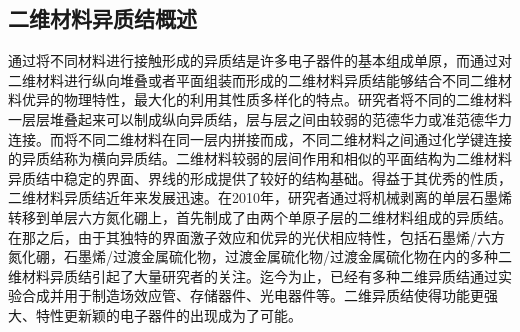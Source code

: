 \subsection{二维材料异质结概述}
    通过将不同材料进行接触形成的异质结是许多电子器件的基本组成单原，而通过对二维材料进行纵向堆叠或者平面组装而形成的二维材料异质结能够结合不同二维材料优异的物理特性，最大化的利用其性质多样化的特点。研究者将不同的二维材料一层层堆叠起来可以制成纵向异质结，层与层之间由较弱的范德华力或准范德华力连接。而将不同二维材料在同一层内拼接而成，不同二维材料之间通过化学键连接的异质结称为横向异质结。二维材料较弱的层间作用和相似的平面结构为二维材料异质结中稳定的界面、界线的形成提供了较好的结构基础。得益于其优秀的性质，二维材料异质结近年来发展迅速。在2010年，研究者通过将机械剥离的单层石墨烯转移到单层六方氮化硼上，首先制成了由两个单原子层的二维材料组成的异质结。在那之后，由于其独特的界面激子效应和优异的光伏相应特性，包括石墨烯/六方氮化硼，石墨烯/过渡金属硫化物，过渡金属硫化物/过渡金属硫化物在内的多种二维材料异质结引起了大量研究者的关注。迄今为止，已经有多种二维异质结通过实验合成并用于制造场效应管、存储器件、光电器件等。二维异质结使得功能更强大、特性更新颖的电子器件的出现成为了可能。

